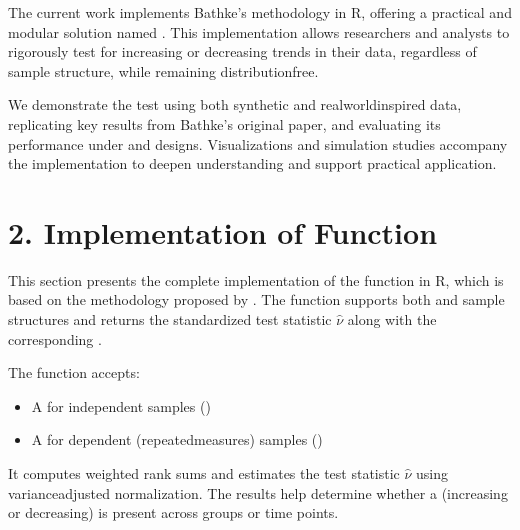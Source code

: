 \documentclass[letterpaper,10pt,english]{jupyterBook}
\begin{document}
\sphinxAtStartPar
The current work implements Bathke’s methodology in R, offering a practical and modular solution named . This implementation allows researchers and analysts to rigorously test for increasing or decreasing trends in their data, regardless of sample structure, while remaining distribution\sphinxhyphen{}free.

\sphinxAtStartPar
We demonstrate the test using both synthetic and real\sphinxhyphen{}world\sphinxhyphen{}inspired data, replicating key results from Bathke’s original paper, and evaluating its performance under  and  designs. Visualizations and simulation studies accompany the implementation to deepen understanding and support practical application.

\sphinxstepscope


\chapter{2. Implementation of  Function}
\label{\detokenize{function:implementation-of-nonpartrendr-test-function}}\label{\detokenize{function::doc}}
\sphinxAtStartPar
This section presents the complete implementation of the  function in R, which is based on the methodology proposed by . The function supports both  and  sample structures and returns the standardized test statistic \(\hat{\nu}\) along with the corresponding .

\sphinxAtStartPar
The function accepts:
\begin{itemize}
\item {} 
\sphinxAtStartPar
A  for independent samples ()

\item {} 
\sphinxAtStartPar
A  for dependent (repeated\sphinxhyphen{}measures) samples ()

\end{itemize}

\sphinxAtStartPar
It computes weighted rank sums and estimates the test statistic \(\hat{\nu}\) using variance\sphinxhyphen{}adjusted normalization. The results help determine whether a  (increasing or decreasing) is present across groups or time points.
\end{document}

